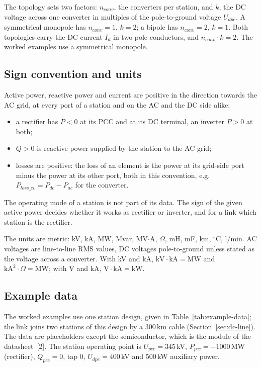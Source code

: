 The topology sets two factors: $n_{conv}$, the converters per station, and $k$, the DC voltage across one converter
in multiples of the pole-to-ground voltage $U_{dpe}$. A symmetrical monopole has $n_{conv} = 1$, $k = 2$; a bipole
has $n_{conv} = 2$, $k = 1$. Both topologies carry the DC current $I_d$ in two pole conductors, and
$n_{conv} \cdot k = 2$. The worked examples use a symmetrical monopole.

\subsection{Sign convention and units}
\label{sec:conventions}

Active power, reactive power and current are positive in the direction towards the AC grid, at every port of a
station and on the AC and the DC side alike:

\begin{itemize}
  \item a rectifier has $P < 0$ at its PCC and at its DC terminal, an inverter $P > 0$ at both;
  \item $Q > 0$ is reactive power supplied by the station to the AC grid;
  \item losses are positive: the loss of an element is the power at its grid-side port minus the power at its other
        port, both in this convention, e.g.\ $P_{loss\_cv} = P_{dc} - P_{ac}$ for the converter.
\end{itemize}

The operating mode of a station is not part of its data. The sign of the given active power decides whether it
works as rectifier or inverter, and for a link which station is the rectifier.

The units are metric: kV, kA, MW, Mvar, MV$\cdot$A, $\Omega$, mH, mF, km, $^{\circ}$C, l/min. AC voltages are
line-to-line RMS values, DC voltages pole-to-ground unless stated as the voltage across a converter. With kV and kA,
$\mathrm{kV} \cdot \mathrm{kA} = \mathrm{MW}$ and $\mathrm{kA}^2 \cdot \Omega = \mathrm{MW}$; with V and kA,
$\mathrm{V} \cdot \mathrm{kA} = \mathrm{kW}$.

\subsection{Example data}
\label{sec:example-data}

The worked examples use one station design, given in Table~\ref{tab:example-data}; the link joins two stations of this
design by a 300\,km cable (Section~\ref{sec:dc-line}). The data are placeholders except the semiconductor, which is
the module of the datasheet~[2]. The station operating point is $U_{pcc} = 345$\,kV, $P_{pcc} = -1000$\,MW (rectifier),
$Q_{pcc} = 0$, tap 0, $U_{dpe} = 400$\,kV and 500\,kW auxiliary power.

